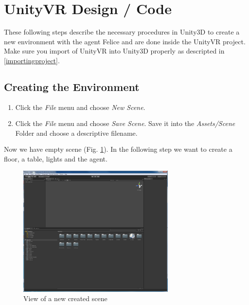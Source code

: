 \documentclass[10pt,final]{scrreprt}
\begin{document}




\section{UnityVR Design / Code}


These following steps describe the necessary procedures in Unity3D to create a new environment with the agent Felice and are done inside the UnityVR project. Make sure you import of UnityVR into Unity3D properly as descripted in \ref{importingproject}.

\subsection{Creating the Environment}
\begin{enumerate}
\item Click the \emph{File} menu and choose \emph{New Scene}.
\item Click the \emph{File} menu and choose \emph{Save Scene}. Save it into the \emph{Assets/Scene} Folder and choose a descriptive filename.
\end{enumerate}

 Now we have empty scene (Fig. \ref{imgemptyscene}). In the following step we want to create a floor, a table, lights and the agent.


\begin{figure}[p]
\begin{center}
\includegraphics[width=0.70\textwidth]{images/emptyscene.png}
\end{center}
\caption{ View of a new created scene}
\label{imgemptyscene}
\end{figure}
\end{document}
